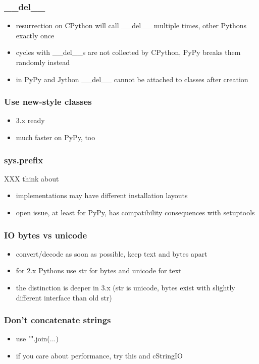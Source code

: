 \documentclass[utf8x, 14pt]{beamer}
\begin{document}
\begin{frame}
  \frametitle{\_\_del\_\_}
  \begin{itemize}
    \item resurrection on CPython will call {\ttfamily \_\_del\_\_} multiple times,
      other Pythons exactly once
    \item cycles with {\ttfamily \_\_del\_\_}s are not collected by CPython,
      PyPy breaks them randomly instead
    \item in PyPy and Jython {\ttfamily \_\_del\_\_} cannot be attached to classes after creation
  \end{itemize}
\end{frame}

\begin{frame}
  \frametitle{Use new-style classes}
  \begin{itemize}
    \item 3.x ready
    \item much faster on PyPy, too
  \end{itemize}
\end{frame}

\begin{frame}
  \frametitle{{\ttfamily sys.prefix}}
  XXX think about
  \begin{itemize}
    \item implementations may have different installation layouts
    \item open issue, at least for PyPy, has compatibility consequences with
  setuptools
  \end{itemize}
\end{frame}

\begin{frame}
  \frametitle{IO bytes vs unicode}
  \begin{itemize}
    \item convert/decode as soon as possible, keep text and bytes apart
    \item for 2.x Pythons use str for bytes and unicode for text
    \item the distinction is deeper in 3.x ({\ttfamily str} is {\ttfamily unicode}, {\ttfamily bytes} exist with
  slightly different interface than old {\ttfamily str})
  \end{itemize}
\end{frame}

\begin{frame}
  \frametitle{Don't concatenate strings}
  \begin{itemize}
    \item use {\ttfamily "".join(...)}
    \item if you care about performance, try this and {\ttfamily cStringIO}
  \end{itemize}
\end{frame}
\end{document}
